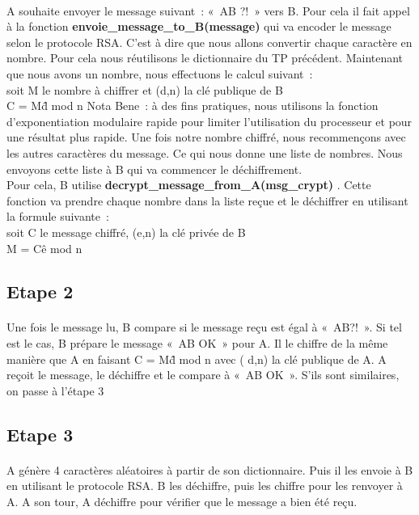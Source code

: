 \documentclass[11pt,fleqn]{book} %
\begin{document}
\paragraph{}A souhaite envoyer le message suivant : « AB ?! » vers B. Pour cela il fait appel à la fonction \textbf{envoie\_message\_to\_B(message)} qui va encoder le message selon le protocole RSA. C'est à dire que nous allons convertir chaque caractère en nombre. Pour cela nous réutilisons le dictionnaire du TP précédent. Maintenant que nous avons un nombre, nous effectuons le calcul suivant : 
\\soit M le nombre à chiffrer et (d,n) la clé publique de B
\\C = M\^d mod n
\vspace{0.5cm}Nota Bene : à des fins pratiques, nous utilisons la fonction d'exponentiation modulaire rapide pour limiter l'utilisation du processeur et pour une résultat plus rapide.
\vspace{0.5cm}Une fois notre nombre chiffré, nous recommençons avec les autres caractères du message. Ce qui nous donne une liste de nombres. Nous envoyons cette liste à B qui va commencer le déchiffrement.
\\Pour cela, B utilise \textbf{decrypt\_message\_from\_A(msg\_crypt)} . Cette fonction va prendre chaque nombre dans la liste reçue et le déchiffrer en utilisant la formule suivante : 
\\soit C le message chiffré, (e,n) la clé privée de B
\\M = C\^e mod n
\subsection{Etape 2}
\paragraph{}Une fois le message lu, B compare si le message reçu est égal à « AB?! ». Si tel est le cas, B prépare le message « AB OK » pour A. Il le chiffre de la même manière que A en faisant C = M\^d mod n avec ( d,n) la clé publique de A.
\vspace{0.5cm}A reçoit le message, le déchiffre et le compare à « AB OK ». S'ils sont similaires, on passe à l'étape 3

\subsection{Etape 3}
\paragraph{}A génère 4 caractères aléatoires à partir de son dictionnaire. Puis il les envoie à B en utilisant le protocole RSA.  B les déchiffre, puis les chiffre pour les renvoyer à A. A son tour, A déchiffre pour vérifier que le message a bien été reçu.
\end{document}
